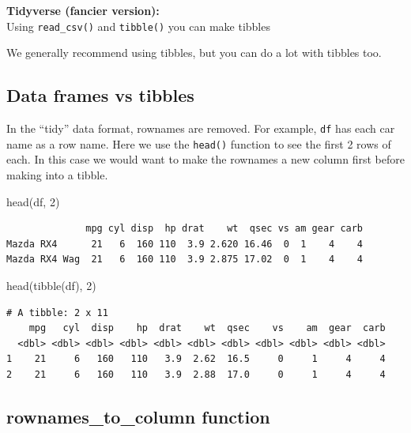 \documentclass[
]{article}
\newenvironment{Shaded}{\begin{snugshade}}{\end{snugshade}}
\newcommand{\DecValTok}[1]{\textcolor[rgb]{0.00,0.00,0.81}{#1}}
\newcommand{\FunctionTok}[1]{\textcolor[rgb]{0.00,0.00,0.00}{#1}}
\newcommand{\NormalTok}[1]{#1}
\begin{document}
\textbf{Tidyverse (fancier version):}\\
Using \texttt{read\_csv()} and \texttt{tibble()} you can make tibbles

We generally recommend using tibbles, but you can do a lot with tibbles
too.

\hypertarget{data-frames-vs-tibbles}{%
\subsection{Data frames vs tibbles}\label{data-frames-vs-tibbles}}

In the ``tidy'' data format, rownames are removed. For example,
\texttt{df} has each car name as a row name. Here we use the
\texttt{head()} function to see the first 2 rows of each. In this case
we would want to make the rownames a new column first before making into
a tibble.

\begin{Shaded}
\begin{Highlighting}[]
\FunctionTok{head}\NormalTok{(df, }\DecValTok{2}\NormalTok{)}
\end{Highlighting}
\end{Shaded}

\begin{verbatim}
              mpg cyl disp  hp drat    wt  qsec vs am gear carb
Mazda RX4      21   6  160 110  3.9 2.620 16.46  0  1    4    4
Mazda RX4 Wag  21   6  160 110  3.9 2.875 17.02  0  1    4    4
\end{verbatim}

\begin{Shaded}
\begin{Highlighting}[]
\FunctionTok{head}\NormalTok{(}\FunctionTok{tibble}\NormalTok{(df), }\DecValTok{2}\NormalTok{)}
\end{Highlighting}
\end{Shaded}

\begin{verbatim}
# A tibble: 2 x 11
    mpg   cyl  disp    hp  drat    wt  qsec    vs    am  gear  carb
  <dbl> <dbl> <dbl> <dbl> <dbl> <dbl> <dbl> <dbl> <dbl> <dbl> <dbl>
1    21     6   160   110   3.9  2.62  16.5     0     1     4     4
2    21     6   160   110   3.9  2.88  17.0     0     1     4     4
\end{verbatim}

\hypertarget{rownames_to_column-function}{%
\subsection{rownames\_to\_column
function}\label{rownames_to_column-function}}
\end{document}
